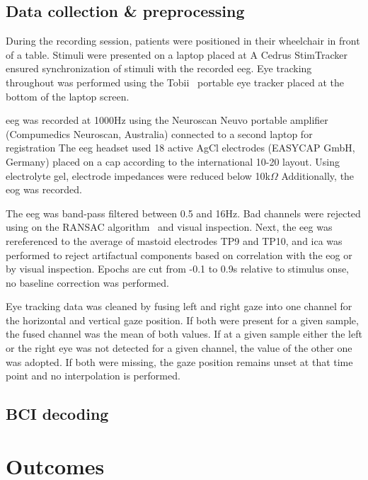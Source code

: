\subsection{Data collection \& preprocessing}

During the recording session, patients were positioned in their wheelchair in front of a table.
Stimuli were presented on a laptop  placed at 
A Cedrus StimTracker  ensured synchronization of stimuli with the
recorded \ac{eeg}.
Eye tracking throughout was performed using the Tobii~
portable eye tracker placed at the bottom of the laptop screen.

\Ac{eeg} was recorded at 1000Hz using the Neuroscan Neuvo  portable amplifier (Compumedics Neuroscan,
Australia) connected to a second laptop for registration
The \ac{eeg} headset used 18 active AgCl electrodes (EASYCAP GmbH, Germany) placed on a cap
according to the international 10-20 layout.
Using electrolyte gel, electrode impedances were reduced below 10k$\Omega$
Additionally, the \ac{eog} was recorded.

The \ac{eeg} was band-pass filtered between 0.5 and 16Hz.
Bad channels were rejected using on the RANSAC algorithm~\cite{Fischler1981}
and visual inspection.
Next, the \ac{eeg} was rereferenced to the average of mastoid electrodes TP9
and TP10, and \ac{ica} was performed to reject artifactual components based on
correlation with the \ac{eog} or by visual inspection.
Epochs are cut from -0.1 to 0.9s relative to stimulus onse, no baseline
correction was performed.

Eye tracking data was cleaned by fusing left and right gaze into one channel
for the horizontal and vertical gaze position.
If both were present for a given sample, the fused channel was the mean of both
values.
If at a given sample either the left or the right eye was not detected for a
given channel, the value of the other one was adopted.
If both were missing, the gaze position remains unset at that time point and no
interpolation is performed.

\subsection{BCI decoding}



\section{Outcomes}

